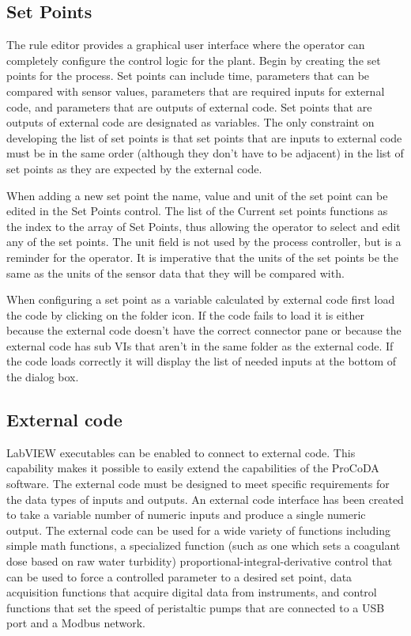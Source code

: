 \documentclass[letterpaper,10pt,english]{sphinxmanual}
\begin{document}
\subsection{Set Points}
\label{\detokenize{ProCoDA/ProCoDA:set-points}}\label{\detokenize{ProCoDA/ProCoDA:heading-procoda-set-points}}
The rule editor provides a graphical user interface where the operator can completely configure the control logic for the plant. Begin by creating the set points for the process. Set points can include time, parameters that can be compared with sensor values, parameters that are required inputs for external code, and parameters that are outputs of external code. Set points that are outputs of external code are designated as variables. The only constraint on developing the list of set points is that set points that are inputs to external code must be in the same order (although they don’t have to be adjacent) in the list of set points as they are expected by the external code.

When adding a new set point the name, value and unit of the set point can be edited in the Set Points control. The list of the Current set points functions as the index to the array of Set Points, thus allowing the operator to select and edit any of the set points. The unit field is not used by the process controller, but is a reminder for the operator. It is imperative that the units of the set points be the same as the units of the sensor data that they will be compared with.


When configuring a set point as a variable calculated by external code first load the code by clicking on the folder icon. If the code fails to load it is either because the external code doesn’t have the correct connector pane or because the external code has sub VIs that aren’t in the same folder as the external code. If the code loads correctly it will display the list of needed inputs at the bottom of the dialog box.


\subsection{External code}
\label{\detokenize{ProCoDA/ProCoDA:external-code}}\label{\detokenize{ProCoDA/ProCoDA:heading-procoda-external-code}}
LabVIEW executables can be enabled to connect to external code. This capability makes it possible to easily extend the capabilities of the ProCoDA software. The external code must be designed to meet specific requirements for the data types of inputs and outputs. An external code interface has been created to take a variable number of numeric inputs and produce a single numeric output. The external code can be used for a wide variety of functions including simple math functions, a specialized function (such as one which sets a coagulant dose based on raw water turbidity) proportional-integral-derivative control that can be used to force a controlled parameter to a desired set point, data acquisition functions that acquire digital data from instruments, and control functions that set the speed of peristaltic pumps that are connected to a USB port and a Modbus network.
\end{document}
